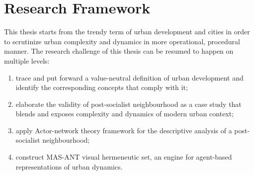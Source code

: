 \documentclass[11pt]{report}
\begin{document}
\section{Research Framework}

This thesis starts from the trendy term of urban development and cities in order to scrutinize urban complexity and dynamics in more operational, procedural manner. The research challenge of this thesis can be resumed to happen on multiple levels:
\begin{enumerate}
\item trace and put forward a value-neutral definition of urban development and identify the corresponding concepts that comply with it;
\item elaborate the validity of post-socialist neighbourhood as a case study that blends and exposes complexity and dynamics of modern urban context;
\item apply Actor-network theory framework for the descriptive analysis of a post-socialist neighbourhood;
\item construct MAS-ANT visual hermeneutic set, an engine for agent-based representations of urban dynamics.    
\end{enumerate}
\end{document}
